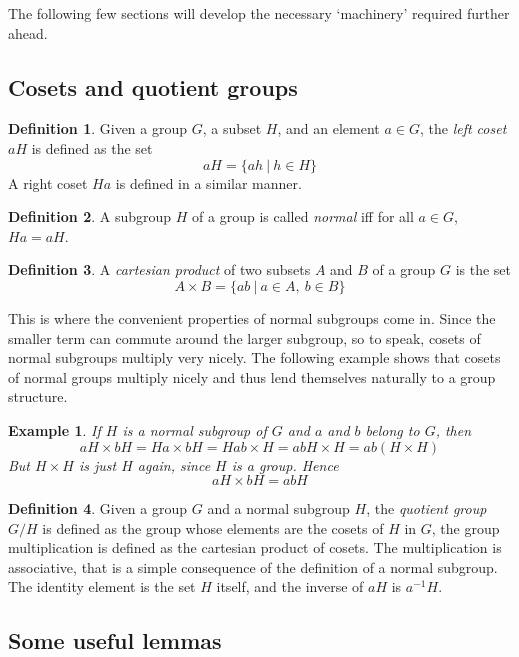 \documentclass[12pt, titlepage]{article}
\newtheorem{exmp}[thm]{Example}
\theoremstyle{definition}
\newtheorem{defn}{Definition}[section]
\begin{document}
The following few sections will develop the necessary `machinery' required further ahead.

\subsection{Cosets and quotient groups}

\begin{defn}
Given a group $G$, a subset $H$, and an element $a \in G$, the \emph{left coset} $aH$ is defined as the set
$$aH = \{ah\ |\ h \in H\}$$
A right coset $Ha$ is defined in a similar manner.
\end{defn}

\begin{defn}
A subgroup $H$ of a group is called \emph{normal} iff for all $a \in G$, $Ha = aH$. 
\end{defn}

\begin{defn}
A \emph{cartesian product} of two subsets $A$ and $B$ of a group $G$ is the set
$$A \times B = \{ab\ |\ a \in A,\ b \in B\}$$
\end{defn}

This is where the convenient properties of normal subgroups come in. Since the smaller term can commute around the larger subgroup, so to speak, cosets of normal subgroups multiply very nicely. The following example shows that cosets of normal groups multiply nicely and thus lend themselves naturally to a group structure.

\begin{exmp}
If $H$ is a normal subgroup of $G$ and $a$ and $b$ belong to $G$, then 
$$aH \times bH = Ha \times bH = Hab \times H = abH \times H = ab(H \times H)$$
But $H \times H$ is just $H$ again, since $H$ is a group. Hence
$$aH \times bH = abH$$
\end{exmp}

\begin{defn}
Given a group $G$ and a normal subgroup $H$, the \emph{quotient group} $G/H$ is defined as the group whose elements are the cosets of $H$ in $G$, the group multiplication is defined as the cartesian product of cosets. The multiplication is associative, that is a simple consequence of the definition of a normal subgroup. The identity element is the set $H$ itself, and the inverse of $aH$ is $a^{-1}H$.
\end{defn}

\subsection{Some useful lemmas\cite{herstein}}
\end{document}
